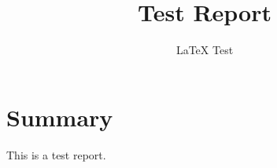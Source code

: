 \documentclass{article}
\title{Test Report}
\author{LaTeX Test}
\begin{document}
\maketitle
\section{Summary}
This is a test report.
\end{document}
